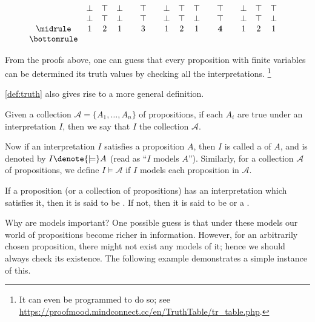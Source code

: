 \begin{myproof}
\begin{nlist}[resume]
\[\begin{array}{c c c c c c c c c c c c c c c c c}
                 & \bot & \top & \bot & 
                 & \top &  & \bot & \top & \top & 
                 & \top &  & \bot & \top & \top &  \\
                 & \bot & \top & \bot & 
                 & \top &  & \bot & \top & \bot & 
                 & \top &  & \bot & \top & \bot &  \\
                \midrule
                 & 1 & 2 & 1 & 
                & 3 &  & 1 & 2 & 1 &
                & \mathbf 4 &  & 1 & 2 & 1  & \\
                \bottomrule
            \end{array}
        \]
    \end{nlist}
\end{myproof}

From the proofs above,
one can guess that
every proposition with finite variables
can be determined its truth values by checking all the interpretations.%
\footnote{It can even be programmed to do so;
see \url{https://proofmood.mindconnect.cc/en/TruthTable/tr_table.php}.}

\cref{def:truth} also gives rise to a more general definition.

\begin{definition}[Models]
    \label{def:model}
    Given a collection \(\mathcal A=\{A_1,\dots,A_n\}\) of propositions,
    if each \(A_i\) are true under an interpretation \(I\),
    then we say that
    \(I\)  the collection \(\mathcal A\).

    Now if an interpretation \(I\) satisfies a proposition \(A\),
    then \(I\) is called a  of \(A\),
    and is denoted by \(I\denote{\models} A\)
    (read as ``\(I\) models \(A\)'').
    Similarly, for a collection \(\mathcal A\) of propositions,
    we define \(I\models\mathcal A\)
    if \(I\) models each proposition in \(\mathcal A\).

    If a proposition (or a collection of propositions)
    has an interpretation which satisfies it,
    then it is said to be .
    If not, then it is said to be 
    or a .
\end{definition}

Why are models important?
One possible guess is that
under these models
our world of propositions become richer in information.
However,
for an arbitrarily chosen proposition,
there might not exist any models of it;
hence we should always check its existence.
The following example demonstrates a simple instance of this.

